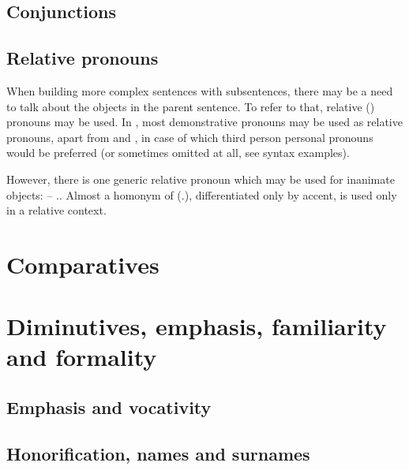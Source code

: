 \subsection{Conjunctions}


\subsection{Relative pronouns}
When building more complex sentences with subsentences, there may be a need to
talk about the objects in the parent sentence. To refer to that, relative
(\Rel{}) pronouns may be used. In \andro, most demonstrative pronouns may be
used as relative pronouns, apart from  and , in case of
which third person personal pronouns would be preferred (or sometimes omitted at
all, see syntax examples).

However, there is one generic relative pronoun which may be used for inanimate
objects:  -- \Rel{}.\Inan{}. Almost a homonym of 
(\Tpl{}.\Inan{}), differentiated only by accent,  is used only in a
relative context.

\section{Comparatives}
\label{sec:comparatives}


\section{Diminutives, emphasis, familiarity and formality}
\label{sec:diminutives}

\subsection{Emphasis and vocativity}


\subsection{Honorification, names and surnames}


